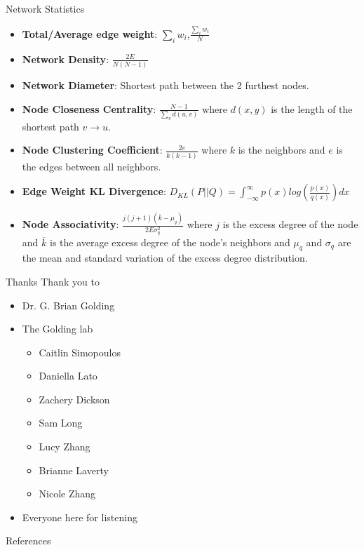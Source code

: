 \documentclass[dvipsnames]{beamer}
\begin{document}
\begin{frame}[fragile]{Network Statistics}
    \begin{itemize}
        \item<2-> \textbf{Total/Average edge weight}: $\sum_i w_i$,$\frac{\sum_i w_i}{N}$
        \item<3-> \textbf{Network Density}: $\frac{2E}{N(N-1)}$
        \item<4-> \textbf{Network Diameter}: Shortest path between the 2 furthest nodes.
        \item<5-> \textbf{Node Closeness Centrality}: $\frac{N-1}{\sum_v d(u,v)}$ where $d(x,y)$ is the length of the shortest path $v \to u$.
        \item<6-> \textbf{Node Clustering Coefficient}: $\frac{2e}{k(k-1)}$ where $k$ is the neighbors and $e$ is the edges between all neighbors.
        \item<7-> \textbf{Edge Weight KL Divergence}: $D_{KL}(P||Q)= \int_{-\infty}^{\infty} p(x)log(\frac{p(x)}{q(x)})dx$
        \item<8-> \textbf{Node Associativity}: $\frac{j(j+1)(\overline{k}-\mu_q)}{2E\sigma^2_q}$ where $j$ is the excess degree of the node and $\overline{k}$ is the average excess degree of the node's neighbors and $\mu_q$ and $\sigma_q$ are the mean and standard variation of the excess degree distribution.
    \end{itemize}
\end{frame}
\begin{frame}{Thanks}
    Thank you to
    \begin{itemize}
        \item Dr. G. Brian Golding
        \item The Golding lab
            \begin{itemize}
                \item Caitlin Simopoulos
                \item Daniella Lato
                \item Zachery Dickson
                \item Sam Long
                \item Lucy Zhang
                \item Brianne Laverty
                \item Nicole Zhang
            \end{itemize}
        \item Everyone here for listening
    \end{itemize}
\end{frame}
\begin{frame}{References}
    \printbibliography
\end{frame}
\end{document}
